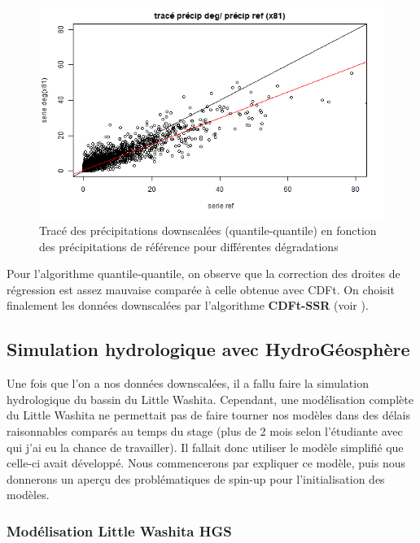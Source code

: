 \documentclass[a4paper,11pt]{article}
\numberwithin{equation}{section}
\begin{document}
\begin{figure}[H]
\begin{minipage}[b]{0.4\linewidth}
	\end{minipage}\hfill
	\begin{minipage}[b]{0.4\linewidth}	
		\centering \includegraphics[scale=0.4]{images/pr_4_dg.png}
	\end{minipage}
	\caption{Tracé des précipitations downscalées (quantile-quantile) en fonction des précipitations de référence pour différentes dégradations}
\end{figure} 


Pour l'algorithme quantile-quantile, on observe que la correction des droites de régression est assez mauvaise comparée à celle obtenue avec CDFt. On choisit finalement les données downscalées par l'algorithme \textbf{CDFt-SSR} (voir \cite{vrac2016bias}).

\subsection{Simulation hydrologique avec HydroGéosphère}

Une fois que l'on a nos données downscalées, il a fallu faire la simulation hydrologique du bassin du Little Washita. Cependant, une modélisation complète du Little Washita ne permettait pas de faire tourner nos modèles dans des délais raisonnables comparés au temps du stage (plus de 2 mois selon l'étudiante avec qui j'ai eu la chance de travailler). Il fallait donc utiliser le modèle simplifié que celle-ci avait développé. Nous commencerons par expliquer ce modèle, puis nous donnerons un aperçu des problématiques de spin-up pour l'initialisation des modèles.  

\subsubsection{Modélisation Little Washita HGS}
\end{document}
